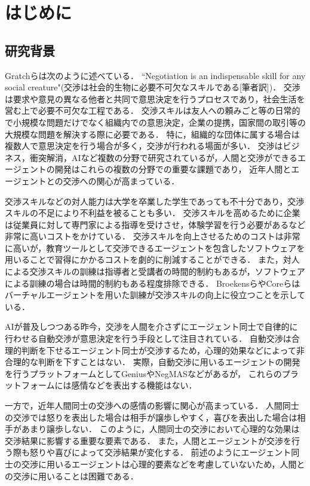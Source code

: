 

\chapter{はじめに}
\section{研究背景}
\label{sec:introduction}
Gratchら\cite{han-challenge}は次のように述べている．
“Negotiation is an indispensable skill for any social creature"(交渉は社会的生物に必要不可欠なスキルである[筆者訳])．
交渉は要求や意見の異なる他者と共同で意思決定を行うプロセスであり，社会生活を営む上で必要不可欠な工程である．
交渉スキルは友人への頼みごと等の日常的で小規模な問題だけでなく組織内での意思決定，企業の提携，国家間の取引等の大規模な問題を解決する際に必要である．
特に，組織的な団体に属する場合は複数人で意思決定を行う場合が多く，交渉が行われる場面が多い\cite{negSurvey}．
交渉はビジネス，衝突解消，AIなど複数の分野で研究されているが，人間と交渉ができるエージェントの開発はこれらの複数の分野での重要な課題であり，
近年人間とエージェントとの交渉への関心が高まっている\cite{han-challenge}．

交渉スキルなどの対人能力は大学を卒業した学生であっても不十分であり\cite{graduate}，交渉スキルの不足により不利益を被ることも多い．
交渉スキルを高めるために企業は従業員に対して専門家による指導を受けさせ，体験学習を行う必要があるなど非常に高いコストをかけている\cite{nego-teach}．
交渉スキルを向上させるためのコストは非常に高いが，教育ツールとして交渉できるエージェントを包含したソフトウェアを用いることで習得にかかるコストを劇的に削減することができる．
また，対人による交渉スキルの訓練は指導者と受講者の時間的制約もあるが，ソフトウェアによる訓練の場合は時間的制約もある程度排除できる．
Broekensら\cite{vr-training}やCoreら\cite{vr-simulation}はバーチャルエージェントを用いた訓練が交渉スキルの向上に役立つことを示している．

AIが普及しつつある昨今，交渉を人間を介さずにエージェント同士で自律的に行わせる自動交渉が意思決定を行う手段として注目されている\cite{automated-negotiation}．
自動交渉は合理的判断を下せるエージェント同士が交渉するため，心理的効果などによって非合理的な判断を下すことはない．
実際，自動交渉に用いるエージェントの開発を行うプラットフォームとしてGenius\cite{genius}やNegMAS\cite{negmas}などがあるが，
これらのプラットフォームには感情などを表出する機能はない．

一方で，近年人間同士の交渉への感情の影響に関心が高まっている\cite{emotion-effect}．
人間同士の交渉では怒りを表出した場合は相手が譲歩しやすく，喜びを表出した場合は相手があまり譲歩しない\cite{emotion-hh}．
このように，人間同士の交渉において心理的な効果は交渉結果に影響する重要な要素である．
また，人間とエージェントが交渉を行う際も怒りや喜びによって交渉結果が変化する\cite{emotion-ha}．
前述のようにエージェント同士の交渉に用いるエージェントは心理的要素などを考慮していないため，人間との交渉に用いることは困難である\cite{pinocchio}．


